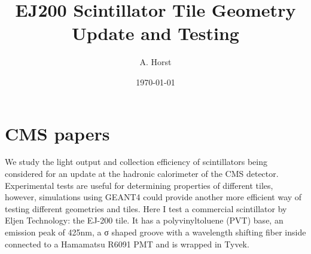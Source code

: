 

\title{EJ200 Scintillator Tile Geometry Update and Testing}%

\author{A. Horst}

\date{\today}


\maketitle %


\section{CMS papers}
We study the light output and collection efficiency of scintillators being considered for an update at the hadronic calorimeter of the CMS detector. Experimental tests are useful for determining properties of different tiles, however, simulations using GEANT4 could provide another more efficient way of testing different geometries and tiles. Here I test a commercial scintillator by Eljen Technology: the EJ-200 tile. It has a polyvinyltoluene (PVT) base, an emission peak of 425nm, a σ shaped groove with a wavelength shifting fiber inside connected to a Hamamatsu R6091 PMT and is wrapped in Tyvek.

